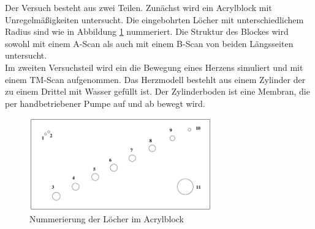 Der Versuch besteht aus zwei Teilen. Zunächst wird ein Acrylblock mit Unregelmäßigkeiten untersucht. Die eingebohrten Löcher mit unterschiedlichem Radius sind wie in Abbildung \ref{fig:acrylblock} nummeriert. Die Struktur des Blockes wird sowohl mit einem A-Scan als auch mit einem B-Scan von beiden Längsseiten untersucht. \\
Im zweiten Versuchsteil wird ein die Bewegung eines Herzens simuliert und mit einem TM-Scan aufgenommen. Das Herzmodell bestehlt aus einem Zylinder der zu einem Drittel mit Wasser gefüllt ist. Der Zylinderboden ist eine Membran, die per handbetriebener Pumpe auf und ab bewegt wird. 


\begin{figure}[h!]
	\centering
	\includegraphics[width=0.7\textwidth]{Acrylblock.png}
	\caption{Nummerierung der Löcher im Acrylblock}
	\label{fig:acrylblock}
\end{figure}
